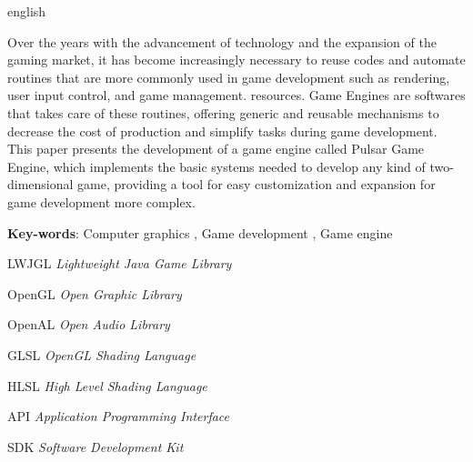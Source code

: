 \documentclass[12pt,	openright, twoside,	a4paper, english, french, spanish, brazil]{abntex2}
\begin{document}
\begin{resumo}[Abstract]
 \begin{otherlanguage*}{english}
 
 Over the years with the advancement of technology and the expansion of the gaming market, it has become increasingly necessary to reuse codes and automate routines that are more commonly used in game development such as rendering, user input control, and game management. resources.
Game Engines are softwares that takes care of these routines, offering generic and reusable mechanisms to decrease the cost of production and simplify tasks during game development.
This paper presents the development of a game engine called Pulsar Game Engine, which implements the basic systems needed to develop any kind of two-dimensional game, providing a tool for easy customization and expansion for game development more complex.

   \vspace{\onelineskip}
 
   \noindent 
   \textbf{Key-words}: Computer graphics , Game development , Game engine
 \end{otherlanguage*}
\end{resumo}


\listoffigures*
\cleardoublepage

\begin{siglas}
\item[LWJGL] \textit{Lightweight Java Game Library}
\item[OpenGL] \textit{Open Graphic Library}
\item[OpenAL] \textit{Open Audio Library}
\item[GLSL] \textit{OpenGL Shading Language}
\item[HLSL] \textit{High Level Shading Language}
\item[API] \textit{Application Programming Interface}
\item[SDK] \textit{Software Development Kit}
\end{siglas}

\tableofcontents*
\cleardoublepage



\textual
\end{document}
